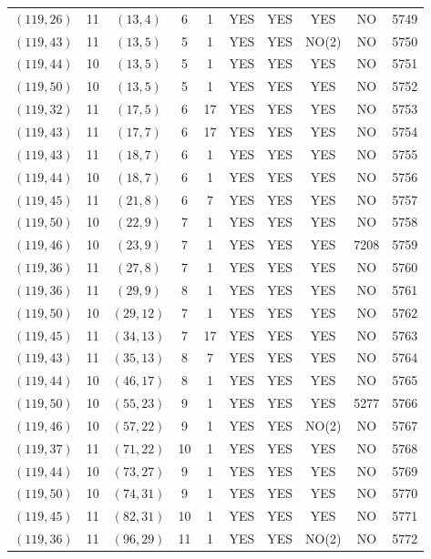 \begin{longtable}{|c|c|c|c|c|c|c|c|c|c|}
$(119, 26)$ & 11 & $(13, 4)$ & 6 & 1 & YES & YES & YES & NO & 5749\\
$(119, 43)$ & 11 & $(13, 5)$ & 5 & 1 & YES & YES & NO(2) & NO & 5750\\
$(119, 44)$ & 10 & $(13, 5)$ & 5 & 1 & YES & YES & YES & NO & 5751\\
$(119, 50)$ & 10 & $(13, 5)$ & 5 & 1 & YES & YES & YES & NO & 5752\\
$(119, 32)$ & 11 & $(17, 5)$ & 6 & 17 & YES & YES & YES & NO & 5753\\
$(119, 43)$ & 11 & $(17, 7)$ & 6 & 17 & YES & YES & YES & NO & 5754\\
$(119, 43)$ & 11 & $(18, 7)$ & 6 & 1 & YES & YES & YES & NO & 5755\\
$(119, 44)$ & 10 & $(18, 7)$ & 6 & 1 & YES & YES & YES & NO & 5756\\
$(119, 45)$ & 11 & $(21, 8)$ & 6 & 7 & YES & YES & YES & NO & 5757\\
$(119, 50)$ & 10 & $(22, 9)$ & 7 & 1 & YES & YES & YES & NO & 5758\\
$(119, 46)$ & 10 & $(23, 9)$ & 7 & 1 & YES & YES & YES & 7208 & 5759\\
$(119, 36)$ & 11 & $(27, 8)$ & 7 & 1 & YES & YES & YES & NO & 5760\\
$(119, 36)$ & 11 & $(29, 9)$ & 8 & 1 & YES & YES & YES & NO & 5761\\
$(119, 50)$ & 10 & $(29, 12)$ & 7 & 1 & YES & YES & YES & NO & 5762\\
$(119, 45)$ & 11 & $(34, 13)$ & 7 & 17 & YES & YES & YES & NO & 5763\\
$(119, 43)$ & 11 & $(35, 13)$ & 8 & 7 & YES & YES & YES & NO & 5764\\
$(119, 44)$ & 10 & $(46, 17)$ & 8 & 1 & YES & YES & YES & NO & 5765\\
$(119, 50)$ & 10 & $(55, 23)$ & 9 & 1 & YES & YES & YES & 5277 & 5766\\
$(119, 46)$ & 10 & $(57, 22)$ & 9 & 1 & YES & YES & NO(2) & NO & 5767\\
$(119, 37)$ & 11 & $(71, 22)$ & 10 & 1 & YES & YES & YES & NO & 5768\\
$(119, 44)$ & 10 & $(73, 27)$ & 9 & 1 & YES & YES & YES & NO & 5769\\
$(119, 50)$ & 10 & $(74, 31)$ & 9 & 1 & YES & YES & YES & NO & 5770\\
$(119, 45)$ & 11 & $(82, 31)$ & 10 & 1 & YES & YES & YES & NO & 5771\\
$(119, 36)$ & 11 & $(96, 29)$ & 11 & 1 & YES & YES & NO(2) & NO & 5772\\

\end{longtable}
